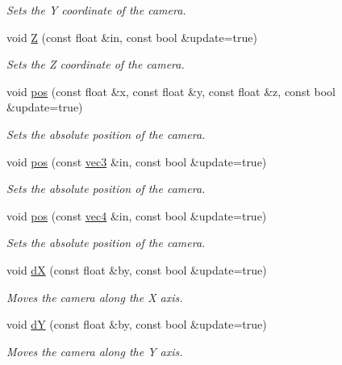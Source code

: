 \begin{DoxyCompactItemize}
\begin{DoxyCompactList}\small\item\em Sets the Y coordinate of the camera. \end{DoxyCompactList}\item 
void \hyperlink{class_camera_a38438f8e2417a3a40eaad85d2ab344a9}{Z} (const float \&in, const bool \&update=true)
\begin{DoxyCompactList}\small\item\em Sets the Z coordinate of the camera. \end{DoxyCompactList}\item 
void \hyperlink{class_camera_a432e03c15d63f8839fe4731016d907a4}{pos} (const float \&x, const float \&y, const float \&z, const bool \&update=true)
\begin{DoxyCompactList}\small\item\em Sets the absolute position of the camera. \end{DoxyCompactList}\item 
void \hyperlink{class_camera_ae9dc2206b71b25cf320a05d148cb8b56}{pos} (const \hyperlink{struct_angel_1_1vec3}{vec3} \&in, const bool \&update=true)
\begin{DoxyCompactList}\small\item\em Sets the absolute position of the camera. \end{DoxyCompactList}\item 
void \hyperlink{class_camera_aec2115038562e514193bb2b67f5da153}{pos} (const \hyperlink{struct_angel_1_1vec4}{vec4} \&in, const bool \&update=true)
\begin{DoxyCompactList}\small\item\em Sets the absolute position of the camera. \end{DoxyCompactList}\item 
void \hyperlink{class_camera_ac7985a6cb48f4e1e74fda17e5213dd74}{d\-X} (const float \&by, const bool \&update=true)
\begin{DoxyCompactList}\small\item\em Moves the camera along the X axis. \end{DoxyCompactList}\item 
void \hyperlink{class_camera_a59570a88e3ff2d277c9e995372fcadfe}{d\-Y} (const float \&by, const bool \&update=true)
\begin{DoxyCompactList}\small\item\em Moves the camera along the Y axis. \end{DoxyCompactList}\item 

\end{DoxyCompactItemize}
